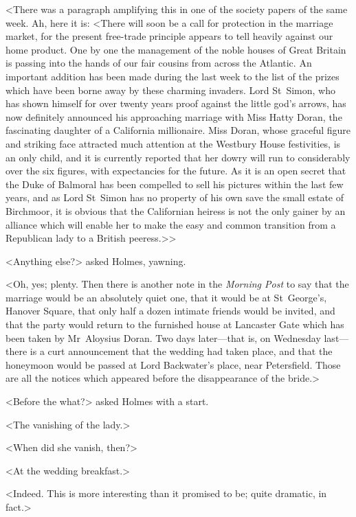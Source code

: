 <There was a paragraph amplifying this in one of the society papers of the same week. Ah, here it is: <There will soon be a call for protection in the marriage market, for the present free-trade principle appears to tell heavily against our home product. One by one the management of the noble houses of Great Britain is passing into the hands of our fair cousins from across the Atlantic. An important addition has been made during the last week to the list of the prizes which have been borne away by these charming invaders. Lord St~Simon, who has shown himself for over twenty years proof against the little god's arrows, has now definitely announced his approaching marriage with Miss Hatty Doran, the fascinating daughter of a California millionaire. Miss Doran, whose graceful figure and striking face attracted much attention at the Westbury House festivities, is an only child, and it is currently reported that her dowry will run to considerably over the six figures, with expectancies for the future. As it is an open secret that the Duke of Balmoral has been compelled to sell his pictures within the last few years, and as Lord St~Simon has no property of his own save the small estate of Birchmoor, it is obvious that the Californian heiress is not the only gainer by an alliance which will enable her to make the easy and common transition from a Republican lady to a British peeress.>>

<Anything else?> asked Holmes, yawning.

<Oh, yes; plenty. Then there is another note in the \textit{Morning Post} to say that the marriage would be an absolutely quiet one, that it would be at St~George's, Hanover Square, that only half a dozen intimate friends would be invited, and that the party would return to the furnished house at Lancaster Gate which has been taken by Mr~Aloysius Doran. Two days later—that is, on Wednesday last—there is a curt announcement that the wedding had taken place, and that the honeymoon would be passed at Lord Backwater's place, near Petersfield. Those are all the notices which appeared before the disappearance of the bride.>

<Before the what?> asked Holmes with a start.

<The vanishing of the lady.>

<When did she vanish, then?>

<At the wedding breakfast.>

<Indeed. This is more interesting than it promised to be; quite dramatic, in fact.>

